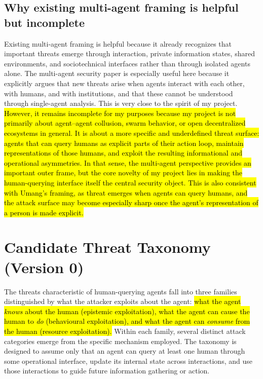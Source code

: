\documentclass[11pt]{article}
\begin{document}
\subsection{Why existing multi-agent framing is helpful but incomplete}

Existing multi-agent framing is helpful because it already recognizes that important threats emerge through interaction, private information states, shared environments, and sociotechnical interfaces rather than through isolated agents alone. The multi-agent security paper is especially useful here because it explicitly argues that new threats arise when agents interact with each other, with humans, and with institutions, and that these cannot be understood through single-agent analysis. \citep{schroeder2025multiagentsecurity,hammond2025multiagentrisks} This is very close to the spirit of my project. \hl{However, it remains incomplete for my purposes because my project is not primarily about agent--agent collusion, swarm behavior, or open decentralized ecosystems in general. It is about a more specific and underdefined threat surface: agents that can query humans as explicit parts of their action loop, maintain representations of those humans, and exploit the resulting informational and operational asymmetries. In that sense, the multi-agent perspective provides an important outer frame, but the core novelty of my project lies in making the human-querying interface itself the central security object. This is also consistent with Umang's framing, as threat emerges when agents can query humans, and the attack surface may become especially sharp once the agent's representation of a person is made explicit.}

\section{Candidate Threat Taxonomy (Version 0)}

The threats characteristic of human-querying agents fall into three families distinguished by what the attacker exploits about the agent: \hl{what the agent \emph{knows} about the human (epistemic exploitation), what the agent can cause the human to \emph{do} (behavioural exploitation), and what the agent can \emph{consume} from the human (resource exploitation).} Within each family, several distinct attack categories emerge from the specific mechanism employed. The taxonomy is designed to assume only that an agent can query at least one human through some operational interface, update its internal state across interactions, and use those interactions to guide future information gathering or action. \citep{oliver2026humanapi,franklin2026agenttraps,schroeder2025multiagentsecurity,brown2022privacylm}
\end{document}

